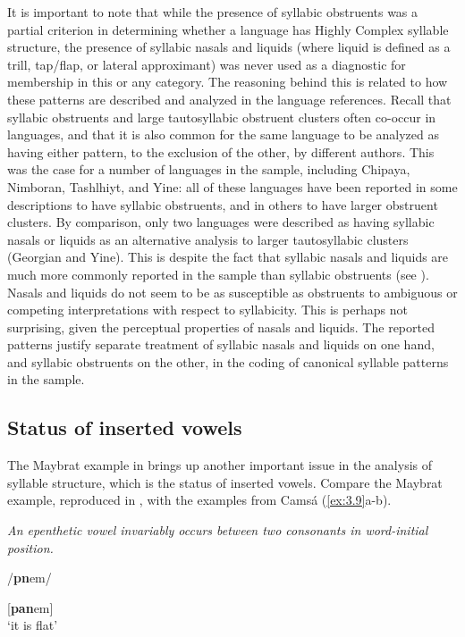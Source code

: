   It is important to note that while the presence of syllabic obstruents was a partial criterion in determining whether a language has Highly Complex syllable structure, the presence of syllabic nasals and liquids (where liquid is defined as a trill, tap/flap, or lateral approximant) was never used as a diagnostic for membership in this or any category. The reasoning behind this is related to how these patterns are described and analyzed in the language references. Recall that syllabic obstruents and large tautosyllabic obstruent clusters often co-occur in languages, and that it is also common for the same language to be analyzed as having either pattern, to the exclusion of the other, by different authors. This was the case for a number of languages in the sample, including Chipaya, Nimboran, Tashlhiyt, and Yine: all of these languages have been reported in some descriptions to have syllabic obstruents, and in others to have larger obstruent clusters. By comparison, only two languages were described as having syllabic nasals or liquids as an alternative analysis to larger tautosyllabic clusters (Georgian and Yine). This is despite the fact that syllabic nasals and liquids are much more commonly reported in the sample than syllabic obstruents (see ). Nasals and liquids do not seem to be as susceptible as obstruents to ambiguous or competing interpretations with respect to syllabicity. This is perhaps not surprising, given the perceptual properties of nasals and liquids. The reported patterns justify separate treatment of syllabic nasals and liquids on one hand, and syllabic obstruents on the other, in the coding of canonical syllable patterns in the sample.

\subsection{Status of inserted vowels}\label{sec:3.2.2}

  The Maybrat example in  brings up another important issue in the analysis of syllable structure, which is the status of inserted vowels. Compare the Maybrat example, reproduced in , with the examples from Camsá (\ref{ex:3.9}a-b).

\ea\label{ex:3.8}

\textit{An epenthetic vowel invariably occurs between two consonants in word-initial position.}

/\textbf{pn}em/

[\textbf{pan}em]\\
\glt ‘it is flat’
\citep[35-6]{Dol2007}
\z

